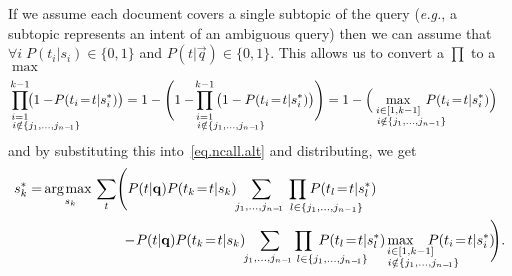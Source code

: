 If we assume each document covers a single subtopic of the query (\emph{e.g.},
a subtopic represents an intent of an ambiguous query) then we can assume that 
$\forall i \; P(t_i|s_i) \in \{0,1\}$ and $P(t|\vec{q}) \in \{0,1\}$.  This
allows us to convert a $\prod$ to a $\max$ 
\begin{align*}
  \hspace{-13mm} \prod_{\substack{i=1 \\ \hspace{14mm} i \notin \{j_1, \dots, j_{n-\!1}\}}}^{k-1} \hspace{-14mm} \bigl( 1 - \!P(t_i\!=\!t|s_i^*) \bigr) & =
1 - \Biggl( 1 - \hspace{-14mm} \prod_{\substack{i=1 \\ \hspace{14mm} i \notin \{j_1, \dots, j_{n-\!1}\}}}^{k-1} \hspace{-13mm} \bigl( 1 - P(t_i\!=\!t|s_i^*) \bigr) \Biggr) 
   = 1 - \Bigl( \hspace{-6mm} \max_{\substack{i \in [1,k-1] \\ \hspace{7mm} i \notin \{j_1, \dots, j_{n-1}\}}} \hspace{-6mm} P(t_i\!=\!t|s_i^*) \Bigr)
\end{align*}
and by substituting this into~\eqref{eq.ncall.alt} and distributing, we get
\begin{align}
s_k^* =  & \, \argmax_{s_k} \sum_t \Biggl( P(t|\vec{q}) P(t_k\!=\!t|s_k)  \sum_{\hspace{-1mm} j_1, \dots, j_{n-\!1}} \hspace{-13.5mm} \prod_{\hspace{14.5mm} l \in \{j_1, \dots, j_{n-1}\}} \hspace{-14mm} P(t_l\!=\!t|s_l^*) \nonumber \\
  & \hspace{20mm} - \!P(t|\vec{q}) P(t_k\!=\!t|s_k) \sum_{\hspace{-1mm} j_1, \dots, j_{n-\!1}} \hspace{-14mm} \prod_{\hspace{14.5mm} l \in \{j_1, \dots, j_{n-\!1}\}} \hspace{-13mm} P(t_l\!=\!t|s_l^*) \hspace{-11.5mm} \max_{\substack{\hspace{5mm} i \in [1,k-1] \\ \hspace{11.5mm} i \notin \{j_1, \dots, j_{n-\!1}\}}} \hspace{-8.5mm} P(t_i\!=\!t|s_i^*) \!\!\Biggr) . \label{eq.ncall.alt2} 
\end{align}

